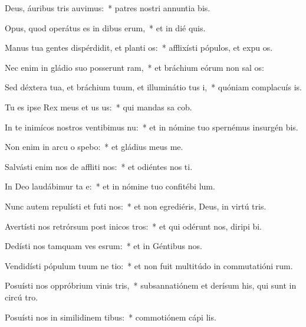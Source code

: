 \item Deus, áuribus tris auvimus:~* patres nostri annuntia bis.
\item Opus, quod operátus es in dibus erum,~* et in dié quis.
\item Manus tua gentes dispérdidit, et planti os:~* afflixísti pópulos, et expu os.
\item Nec enim in gládio suo posserunt ram,~* et bráchium eórum non sal os:
\item Sed déxtera tua, et bráchium tuum, et illuminátio tus i,~* quóniam complacuís  is.
\item Tu es ipse Rex meus et us us:~* qui mandas sa cob.
\item In te inimícos nostros ventibimus nu:~* et in nómine tuo spernémus insurgén  bis.
\item Non enim in arcu o spebo:~* et gládius meus   me.
\item Salvásti enim nos de affliti nos:~* et odiéntes nos ti.
\item In Deo laudábimur ta e:~* et in nómine tuo confitébi  lum.
\item Nunc autem repulísti et futi nos:~* et non egrediéris, Deus, in virtú tris.
\item Avertísti nos retrórsum post inicos tros:~* et qui odérunt nos, diripi bi.
\item Dedísti nos tamquam ves esrum:~* et in Géntibus  nos.
\item Vendidísti pópulum tuum ne tio:~* et non fuit multitúdo in commutatióni rum.
\item Posuísti nos oppróbrium vinis tris,~* subsannatiónem et derísum his, qui sunt in circú tro.
\item Posuísti nos in similidinem tibus:~* commotiónem cápi  lis.
